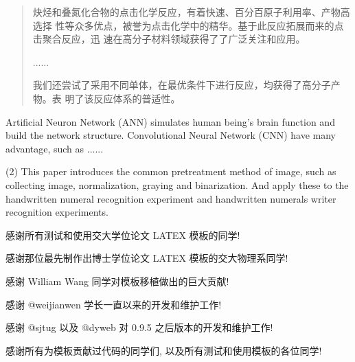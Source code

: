 \documentclass{scutthesis}
\begin{document}
  \makecover

  \frontmatter
  \begin{abstract}
    炔烃和叠氮化合物的点击化学反应，有着快速、百分百原子利用率、产物高选择
    性等众多优点，被誉为点击化学中的精华。基于此反应拓展而来的点击聚合反应，迅
    速在高分子材料领域获得了了广泛关注和应用。

    ......
    
    我们还尝试了采用不同单体，在最优条件下进行反应，均获得了高分子产物。表
    明了该反应体系的普适性。

  \end{abstract}
  \begin{englishabstract}
    Artificial Neuron Network (ANN) simulates human being’s brain 
    function and build the network structure. Convolutional Neural 
    Network (CNN) have many advantage, such as ...... 
    
    (2) This paper introduces the common pretreatment method of image, 
    such as collecting image, normalization, graying and binarization. 
    And apply these to the handwritten numeral recognition experiment 
    and handwritten numerals writer recognition experiments.
  \end{englishabstract}
  
  \tableofcontents

  \mainmatter
  
  
  
 

  \printbibliography[heading=bibintoc]

  \begin{thanks}
    感谢所有测试和使用交大学位论文 LATEX 模板的同学! 
    
    感谢那位最先制作出博士学位论文 LATEX 模板的交大物理系同学!
    
    感谢 William Wang 同学对模板移植做出的巨大贡献!
    
    感谢 @weijianwen 学长一直以来的开发和维护工作!
    
    感谢 @sjtug 以及 @dyweb 对 0.9.5 之后版本的开发和维护工作! 
    
    感谢所有为模板贡献过代码的同学们, 以及所有测试和使用模板的各位同学!
  \end{thanks}
 
\end{document}
